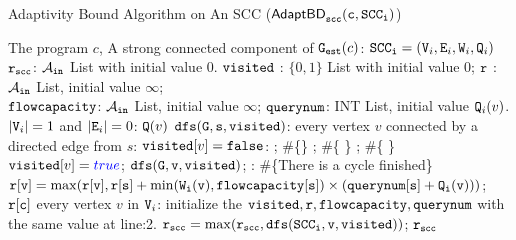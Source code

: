 {\footnotesize
\begin{algorithm}
            \caption{
            {\small Adaptivity Bound Algorithm on An SCC ({$\mathtt{\mathsf{AdaptBD}_{scc}(c, SCC_i)}$})}
            \label{alg:adaptscc}
            }
            \begin{algorithmic}[1]
              \REQUIRE The program $c$, 
              A strong connected component of $\mathtt{{G_{est}}}(c)$: $ \mathtt{SCC_i} = (\mathtt{V}_i, \mathtt{E}_i, \mathtt{W}_i, \mathtt{Q}_i)$
            $\mathtt{r_{scc}}$: $\mathcal{A}_{\mathtt{in}}$ List with initial value $0$.
            $\mathtt{visited}$ : $\{0, 1\}$ List with initial value $0$;
            $\mathtt{r}$ : $\mathcal{A}_{\mathtt{in}}$ List, initial value $\infty$;
            \\ \qquad  
            $\mathtt{flowcapacity}$: $\mathcal{A}_{\mathtt{in}}$ List, initial value $\infty$;
            $\mathtt{querynum}$: INT List, initial value $\mathtt{Q}_i(v)$.
             $|\mathtt{V}_i| = 1$ and $|\mathtt{E}_i| = 0$:
              $\mathtt{Q}(v)$
             {$\mathtt{dfs(G,s,visited)}$}:
            \STATE {} every vertex $v$ 
            connected by a directed edge from $s$:
            \STATE \qquad {} $\mathtt{visited}[v] = \mathtt{false}$:
            \STATE \qquad \qquad {}; \qquad \qquad \#\{\}
            \STATE \qquad \qquad {}; \qquad \qquad \qquad \qquad\#\{ \}
            \STATE \qquad \qquad {}; \#\{ \}
            \STATE \qquad \qquad \qquad  $\kw{visited}[v] = \highlight{true}$; %
            \quad $\mathtt{dfs(G, v, visited)}$;
            \STATE \qquad {}: \#\{There is a cycle finished\}
            \STATE \qquad \qquad \qquad 
            {\small{$\mathtt{r[v] =  \max(r[v], r[s] +\min(\mathtt{W}_i(v), {flowcapacity}[s]) \times (querynum[s] + \mathtt{Q}_i(v)))}$}};
            \STATE {}  $\mathtt{r[c]}$
             every vertex $v$ in $\mathtt{V}_i$:
            \STATE  \qquad initialize the $\mathtt{visited, r, flowcapacity, querynum}$ with the same value at line:2.
            \STATE  \qquad $\mathtt{r_{scc} = \max(r_{scc}, dfs(SCC_i, v, \mathtt{visited} ))}$;
            \RETURN  $\mathtt{r_{scc}}$
            \end{algorithmic}
            \end{algorithm}
}           

